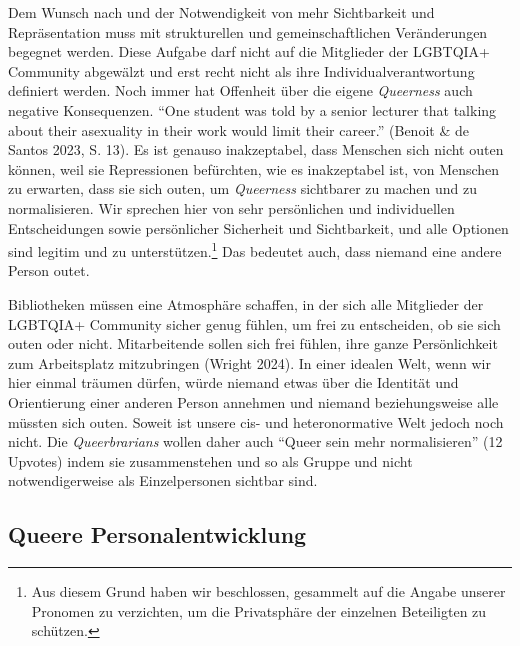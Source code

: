 \documentclass[a4paper,
fontsize=11pt,
oneside,
numbers=noperiodatend,
parskip=half-,
bibliography=totoc,
final
]{scrartcl}
\begin{document}
Dem Wunsch nach und der Notwendigkeit von mehr Sichtbarkeit und
Repräsentation muss mit strukturellen und gemeinschaftlichen
Veränderungen begegnet werden. Diese Aufgabe darf nicht auf die
Mitglieder der LGBTQIA+ Community abgewälzt und erst recht nicht als
ihre Individualverantwortung definiert werden. Noch immer hat Offenheit
über die eigene \emph{Queerness} auch negative Konsequenzen.
\enquote{One student was told by a senior lecturer that talking about
their asexuality in their work would limit their career.} (Benoit \& de
Santos 2023, S. 13). Es ist genauso inakzeptabel, dass Menschen sich
nicht outen können, weil sie Repressionen befürchten, wie es
inakzeptabel ist, von Menschen zu erwarten, dass sie sich outen, um
\emph{Queerness} sichtbarer zu machen und zu normalisieren. Wir sprechen
hier von sehr persönlichen und individuellen Entscheidungen sowie
persönlicher Sicherheit und Sichtbarkeit, und alle Optionen sind legitim
und zu unterstützen.\footnote{Aus diesem Grund haben wir beschlossen,
  gesammelt auf die Angabe unserer Pronomen zu verzichten, um die
  Privatsphäre der einzelnen Beteiligten zu schützen.} Das bedeutet
auch, dass niemand eine andere Person outet.

Bibliotheken müssen eine Atmosphäre schaffen, in der sich alle
Mitglieder der LGBTQIA+ Community sicher genug fühlen, um frei zu
entscheiden, ob sie sich outen oder nicht. Mitarbeitende sollen sich
frei fühlen, ihre ganze Persönlichkeit zum Arbeitsplatz mitzubringen
(Wright 2024). In einer idealen Welt, wenn wir hier einmal träumen
dürfen, würde niemand etwas über die Identität und Orientierung einer
anderen Person annehmen und niemand beziehungsweise alle müssten sich
outen. Soweit ist unsere cis- und heteronormative Welt jedoch noch
nicht. Die \emph{Queerbrarians} wollen daher auch \enquote{Queer sein
mehr normalisieren} (12 Upvotes) indem sie zusammenstehen und so als
Gruppe und nicht notwendigerweise als Einzelpersonen sichtbar sind.

\subsection{Queere Personalentwicklung}\label{queere-personalentwicklung}
\end{document}
